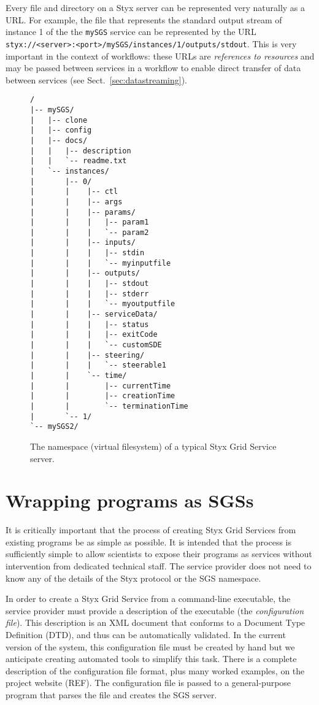 \documentclass{llncs}
\begin{document}
Every file and directory on a Styx server can be represented very naturally as a URL.  For example, the file that represents the standard output stream of instance 1 of the the {\tt mySGS} service can be represented by the URL {\tt styx://<server>:<port>/mySGS/instances/1/outputs/stdout}.  This is very important in the context of workflows: these URLs are {\em references to resources\/} and may be passed between services in a workflow to enable direct transfer of data between services (see Sect.~\ref{sec:datastreaming}).

\begin{figure}
\begin{verbatim}
/
|-- mySGS/
|   |-- clone
|   |-- config
|   |-- docs/
|   |   |-- description
|   |   `-- readme.txt
|   `-- instances/
|       |-- 0/
|       |    |-- ctl
|       |    |-- args
|       |    |-- params/
|       |    |   |-- param1
|       |    |   `-- param2
|       |    |-- inputs/
|       |    |   |-- stdin
|       |    |   `-- myinputfile
|       |    |-- outputs/
|       |    |   |-- stdout
|       |    |   |-- stderr
|       |    |   `-- myoutputfile
|       |    |-- serviceData/
|       |    |   |-- status
|       |    |   |-- exitCode
|       |    |   `-- customSDE
|       |    |-- steering/
|       |    |   `-- steerable1
|       |    `-- time/
|       |        |-- currentTime
|       |        |-- creationTime
|       |        `-- terminationTime
|       `-- 1/
`-- mySGS2/
\end{verbatim}
\caption{The namespace (virtual filesystem) of a typical Styx Grid Service server.}\label{fig:sgsnamespace}
\end{figure}
%
\section{Wrapping programs as SGSs}
It is critically important that the process of creating Styx Grid Services from existing programs be as simple as possible.  It is intended that the process is sufficiently simple to allow scientists to expose their programs as services without intervention from dedicated technical staff.  The service provider does not need to know any of the details of the Styx protocol or the SGS namespace.

In order to create a Styx Grid Service from a command-line executable, the service provider must provide a description of the executable (the {\em configuration file\/}).  This description is an XML document that conforms to a Document Type Definition (DTD), and thus can be automatically validated.  In the current version of the system, this configuration file must be created by hand but we anticipate creating automated tools to simplify this task.  There is a complete description of the configuration file format, plus many worked examples, on the project website (REF).  The configuration file is passed to a general-purpose program that parses the file and creates the SGS server.
\end{document}
